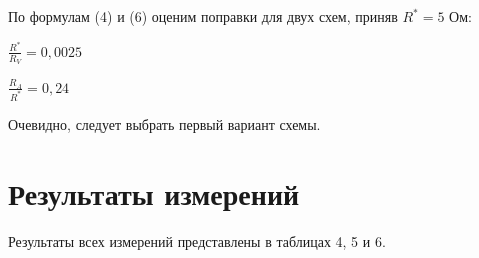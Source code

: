 \documentclass{report}
\begin{document}
	По формулам (4) и (6) оценим поправки для двух схем, приняв $R^{*} = 5$ Ом:
	
	$\frac{R^{*}}{R_{V}} = 0,0025$
	
	$\frac{R_{A}}{R^{*}} = 0,24$
	
	Очевидно, следует выбрать первый вариант схемы.
	
	\section*{Результаты измерений}
	
	Результаты всех измерений представлены в таблицах 4, 5 и 6.
	
	\begin{table}[!h]
		\centering
	\end{table}
	
\end{document}
